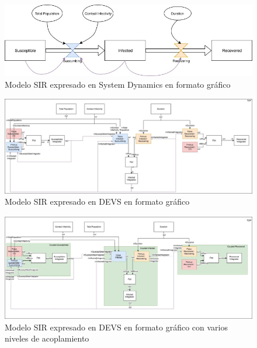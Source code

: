 \begin{figure}[!h]
\centering
\includegraphics[scale=0.5]{imagenes/SIR_sd.jpg}
\caption{Modelo SIR expresado en System Dynamics en formato gráfico}
\label{fig:SIR_sd}
\end{figure}
\begin{figure}[!h]
\centering
\includegraphics[scale=0.3]{imagenes/SIR_devs_flattened.jpg}
\caption{Modelo SIR expresado en DEVS en formato gráfico}
\label{fig:SIR_devs_flattened}
\end{figure}
\begin{figure}[!h]
\centering
\includegraphics[scale=0.3]{imagenes/SIR_devs.jpg}
\caption{Modelo SIR expresado en DEVS en formato gráfico con varios niveles de acoplamiento}
\label{fig:SIR_devs}
\end{figure}
